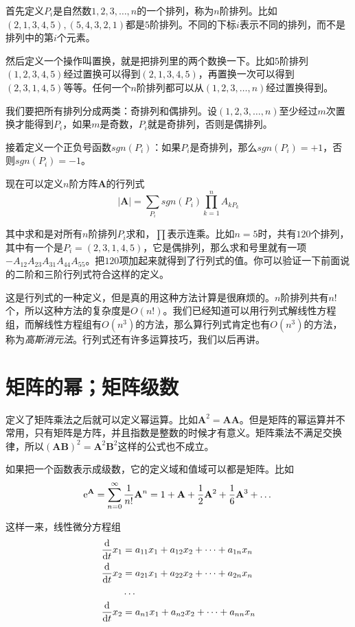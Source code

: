 首先定义$P_i$是自然数$1, 2, 3, \dots, n$的一个排列，称为$n$阶排列。比如$(2, 1, 3, 4, 5), (5, 4, 3, 2, 1)$都是$5$阶排列。不同的下标$i$表示不同的排列，而不是排列中的第$i$个元素。

然后定义一个操作叫置换，就是把排列里的两个数换一下。比如$5$阶排列$(1, 2, 3, 4, 5)$经过置换可以得到$(2, 1, 3, 4, 5)$，再置换一次可以得到$(2, 3, 1, 4, 5)$等等。任何一个$n$阶排列都可以从$(1, 2, 3, \dots, n)$经过置换得到。

我们要把所有排列分成两类：奇排列和偶排列。设$(1, 2, 3, \dots, n)$至少经过$m$次置换才能得到$P_i$，如果$m$是奇数，$P_i$就是奇排列，否则是偶排列。

接着定义一个正负号函数$sgn(P_i)$：如果$P_i$是奇排列，那么$sgn(P_i)=+1$，否则$sgn(P_i)=-1$。

现在可以定义$n$阶方阵$\mathbf{A}$的行列式
\begin{equation*}
|\mathbf{A}|=\sum_{P_i} sgn(P_i) \prod_{k=1}^n A_{k P_k}
\end{equation*}

其中求和是对所有$n$阶排列$P_i$求和，$\prod$表示连乘。比如$n=5$时，共有$120$个排列，其中有一个是$P_i=(2, 3, 1, 4, 5)$，它是偶排列，那么求和号里就有一项$-A_{1 2} A_{2 3} A_{3 1} A_{4 4} A_{5 5}$。把$120$项加起来就得到了行列式的值。你可以验证一下前面说的二阶和三阶行列式符合这样的定义。

这是行列式的一种定义，但是真的用这种方法计算是很麻烦的。$n$阶排列共有$n!$个，所以这种方法的复杂度是$O(n!)$。我们已经知道可以用行列式解线性方程组，而解线性方程组有$O(n^3)$的方法，那么算行列式肯定也有$O(n^3)$的方法，称为\emph{高斯消元法}。行列式还有许多运算技巧，我们以后再讲。
\section{矩阵的幂；矩阵级数}
定义了矩阵乘法之后就可以定义幂运算。比如$\mathbf{A}^2=\mathbf{A} \mathbf{A}$。但是矩阵的幂运算并不常用，只有矩阵是方阵，并且指数是整数的时候才有意义。矩阵乘法不满足交换律，所以$(\mathbf{A} \mathbf{B})^2=\mathbf{A}^2 \mathbf{B}^2$这样的公式也不成立。

如果把一个函数表示成级数，它的定义域和值域可以都是矩阵。比如
\begin{equation*}
\mathrm{e}^\mathbf{A}=\sum_{n=0}^{\infty}\frac{1}{n!}\mathbf{A}^n=1+\mathbf{A}+\frac{1}{2}\mathbf{A}^2+\frac{1}{6}\mathbf{A}^3+\dots
\end{equation*}

这样一来，线性微分方程组
\begin{align*}
\frac{\mathop{}\!\mathrm{d}}{\mathop{}\!\mathrm{d} t} x_1 &=a_{1 1} x_1+a_{1 2} x_2+\dots+a_{1 n} x_n \\
\frac{\mathop{}\!\mathrm{d}}{\mathop{}\!\mathrm{d} t} x_2 &=a_{2 1} x_1+a_{2 2} x_2+\dots+a_{2 n} x_n \\
&\dots \\
\frac{\mathop{}\!\mathrm{d}}{\mathop{}\!\mathrm{d} t} x_2 &=a_{n 1} x_1+a_{n 2} x_2+\dots+a_{n n} x_n
\end{align*}

